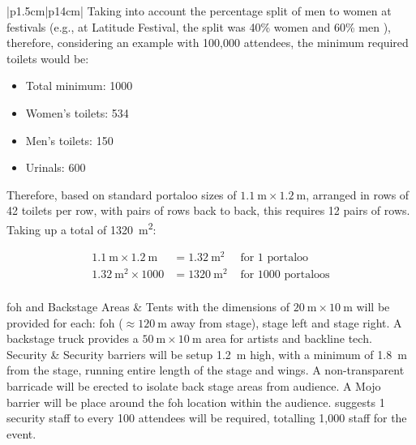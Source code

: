 \begin{longtable}{|p{1.5cm}|p{14cm}|}
                Taking into account the percentage split of men to women at festivals (e.g., at Latitude Festival, the split was 40\% women and 60\% men \citep{aawbi2019}), therefore, considering an example with 100,000 attendees, the minimum required toilets would be:
                
                \begin{itemize}
                    \item Total minimum: 1000
                    \item Women's toilets: 534
                    \item Men's toilets: 150
                    \item Urinals: 600
                \end{itemize}
                
                Therefore, based on standard portaloo sizes of $\SI{1.1}{\metre} \times \SI{1.2}{\metre}$, arranged in rows of 42 toilets per row, with pairs of rows back to back, this requires 12 pairs of rows. Taking up a total of \SI{1320}{\metre\squared}:

                \[
                    \begin{aligned}
                    \SI{1.1}{\metre} \times \SI{1.2}{\metre} &= \SI{1.32}{\metre\squared} &\text{ for 1 portaloo}\\
                    \SI{1.32}{\metre\squared} \times 1000 &= \SI{1320}{\metre\squared} &\text{ for 1000 portaloos}
                    \end{aligned}
                \]
            \\
            \hline
            \acrshort{foh} and Backstage Areas &
                Tents with the dimensions of $\SI{20}{\metre} \times \SI{10}{\metre}$ will be provided for each: \acrshort{foh} ($\approx \SI{120}{\metre}$ away from stage), stage left and stage right. A backstage truck provides a $\SI{50}{\metre} \times \SI{10}{\metre}$ area for artists and backline tech.
            \\
            \hline
            Security &
                Security barriers will be setup \SI{1.2}{\metre} high, with a minimum of \SI{1.8}{\metre} from the stage, running entire length of the stage and wings. A non-transparent barricade will be erected to isolate back stage areas from audience. A Mojo barrier will be place around the \acrshort{foh} location within the audience. \citet{westminster2023} suggests 1 security staff to every 100 attendees will be required, totalling 1,000 staff for the event.
            \\
            \hline

            \caption{Calculation of all amenities}
            \label{tab:amenities_calcs}
        \end{longtable}

